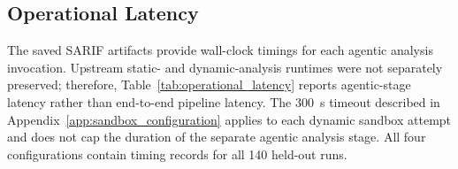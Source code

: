 









\subsection{Operational Latency}
\label{sec:operational-results}
The saved SARIF artifacts provide wall-clock timings for each agentic analysis invocation. Upstream static- and dynamic-analysis runtimes were not separately preserved; therefore, Table~\ref{tab:operational_latency} reports agentic-stage latency rather than end-to-end pipeline latency. The 300~s timeout described in Appendix~\ref{app:sandbox_configuration} applies to each dynamic sandbox attempt and does not cap the duration of the separate agentic analysis stage. All four configurations contain timing records for all 140 held-out runs.

